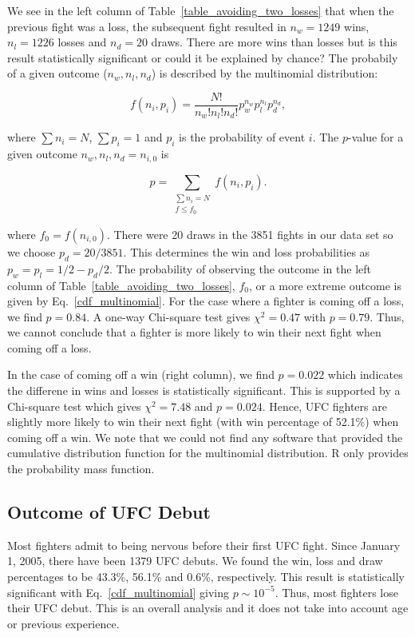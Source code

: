 We see in the left column of Table~\ref{table_avoiding_two_losses} that
when the previous fight was a loss, the subsequent fight resulted
in $n_w=1249$ wins, $n_l=1226$ losses and $n_d=20$ draws. There are more wins than losses but
is this result statistically significant or could it be explained
by chance? The probabily of a given outcome ($n_w, n_l, n_d$) is described by
the multinomial distribution:

\begin{equation}
f(n_i, p_i) = \frac{N!}{n_w! n_l! n_d!}p_w^{n_w}p_l^{n_l}p_d^{n_d},
\end{equation}

\noindent
where $\sum n_i = N$, $\sum p_i=1$ and $p_i$ is the probability
of event $i$. The $p$-value for a given
outcome $n_w, n_l, n_d=n_{i,0}$ is

\begin{equation}
p = \sum_{\substack{{\sum n_i = N} \\ {f \le f_0}}}f(n_i, p_i).
\label{cdf_multinomial}
\end{equation}

\noindent
where $f_0=f(n_{i,0})$.
There were 20 draws in the 3851 fights in our data set so we
choose $p_d=20/3851$. This determines the win and loss probabilities as
$p_w=p_l=1/2 - p_d/2$.
The probability of observing the outcome in the left
column of Table~\ref{table_avoiding_two_losses}, $f_0$, or a more extreme outcome
is given by Eq.~\ref{cdf_multinomial}. For the case where a fighter
is coming off a loss, we find $p=0.84$. A one-way Chi-square test gives $\chi^2=0.47$ with $p=0.79$.
Thus, we cannot conclude that a fighter is more likely to win their next fight
when coming off a loss.

In the case
of coming off a win (right column), we find $p=0.022$ which
indicates the differene in wins and losses is statistically significant. This is supported by a Chi-square test which
gives $\chi^2=7.48$ and $p=0.024$. Hence, 
UFC fighters are slightly more likely to win their next
fight (with win percentage of 52.1\%) when coming off a win.
We note that we could not find any software that provided the cumulative
distribution function for the multinomial distribution. R only provides
the probability mass function.

\subsection*{Outcome of UFC Debut}

Most fighters admit to being nervous before their first UFC fight.
Since January 1, 2005, there have been 1379 UFC debuts. We found the
win, loss and draw percentages to be 43.3\%, 56.1\% and 0.6\%, respectively.
This result is statistically significant with Eq.~\ref{cdf_multinomial}
giving $p \sim 10^{-5}$. Thus, most
fighters lose their UFC debut. This is an overall analysis and it does not
take into account age or previous experience.


